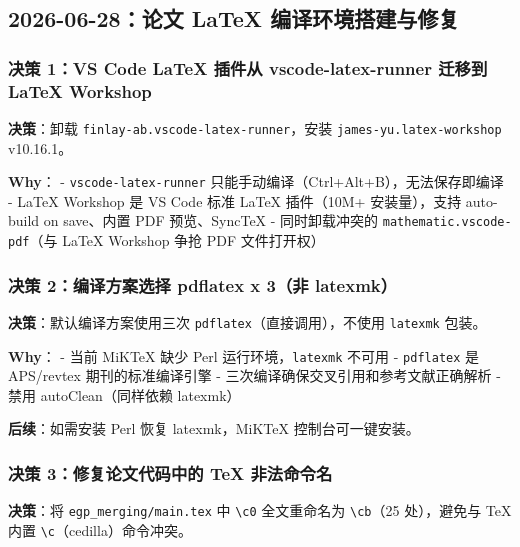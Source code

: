 \documentclass[
  12pt,
]{ctexart}
\begin{document}
\subsection{2026-06-28：论文 LaTeX
编译环境搭建与修复}\label{ux8bbaux6587-latex-ux7f16ux8bd1ux73afux5883ux642dux5efaux4e0eux4feeux590d}

\subsubsection{决策 1：VS Code LaTeX 插件从 vscode-latex-runner 迁移到
LaTeX
Workshop}\label{ux51b3ux7b56-1vs-code-latex-ux63d2ux4ef6ux4ece-vscode-latex-runner-ux8fc1ux79fbux5230-latex-workshop}

\textbf{决策}：卸载 \texttt{finlay-ab.vscode-latex-runner}，安装
\texttt{james-yu.latex-workshop} v10.16.1。

\textbf{Why}： - \texttt{vscode-latex-runner}
只能手动编译（Ctrl+Alt+B），无法保存即编译 - LaTeX Workshop 是 VS Code
标准 LaTeX 插件（10M+ 安装量），支持 auto-build on save、内置 PDF
预览、SyncTeX - 同时卸载冲突的 \texttt{mathematic.vscode-pdf}（与 LaTeX
Workshop 争抢 PDF 文件打开权）

\subsubsection{决策 2：编译方案选择 pdflatex x 3（非
latexmk）}\label{ux51b3ux7b56-2ux7f16ux8bd1ux65b9ux6848ux9009ux62e9-pdflatex-x-3ux975e-latexmk}

\textbf{决策}：默认编译方案使用三次
\texttt{pdflatex}（直接调用），不使用 \texttt{latexmk} 包装。

\textbf{Why}： - 当前 MiKTeX 缺少 Perl 运行环境，\texttt{latexmk} 不可用
- \texttt{pdflatex} 是 APS/revtex 期刊的标准编译引擎 -
三次编译确保交叉引用和参考文献正确解析 - 禁用 autoClean（同样依赖
latexmk）

\textbf{后续}：如需安装 Perl 恢复 latexmk，MiKTeX 控制台可一键安装。

\subsubsection{决策 3：修复论文代码中的 TeX
非法命令名}\label{ux51b3ux7b56-3ux4feeux590dux8bbaux6587ux4ee3ux7801ux4e2dux7684-tex-ux975eux6cd5ux547dux4ee4ux540d}

\textbf{决策}：将 \texttt{egp\_merging/main.tex} 中
\texttt{\textbackslash{}c0} 全文重命名为 \texttt{\textbackslash{}cb}（25
处），避免与 TeX 内置 \texttt{\textbackslash{}c}（cedilla）命令冲突。
\end{document}
